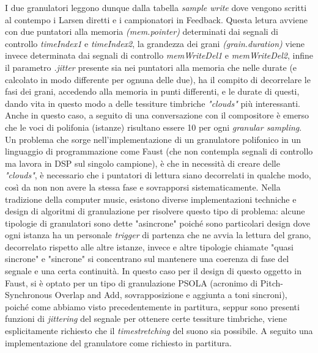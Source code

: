 I due granulatori leggono dunque dalla tabella \textit{sample write} dove vengono scritti
al contempo i Larsen diretti e i campionatori in Feedback. 
Questa letura avviene con due puntatori alla memoria \textit{(mem.pointer)} determinati 
dai segnali di controllo \textit{timeIndex1} e \textit{timeIndex2}, la grandezza dei grani 
\textit{(grain.duration)} viene invece determinata dai segnali di controllo 
\textit{memWriteDel1} e \textit{memWriteDel2}, infine il parametro \textit{.jitter}
presente sia nei puntatori alla memoria che nelle durate (e calcolato in modo differente per ognuna delle due),
ha il compito di decorrelare le fasi dei grani, accedendo alla memoria in punti differenti,
e le durate di questi, dando vita in questo modo a delle tessiture timbriche \textit{"clouds"} più interessanti.
Anche in questo caso, a seguito di una conversazione con il compositore è emerso che le voci di polifonia
(istanze) risultano essere 10 per ogni \textit{granular sampling}.
Un problema che sorge nell'implementazione di un granulatore polifonico in un linguaggio di 
programmazione come Faust (che non contempla segnali di controllo ma lavora in DSP sul singolo campione),
è che in necessità di creare delle \textit{"clouds"}, è necessario che i puntatori di lettura
siano decorrelati in qualche modo, così da non non avere la stessa fase e sovrapporsi sistematicamente.
Nella tradizione della computer music, esistono diverse implementazioni techniche e design 
di algoritmi di granulazione per risolvere questo tipo di problema:
alcune tipologie di granulatori sono dette "asincrone" poiché sono particolari design dove
ogni istanza ha un personale \textit{trigger} 
di partenza che ne avvia la lettura del grano, decorrelato rispetto alle altre istanze,
invece e altre tipologie chiamate "quasi sincrone" e "sincrone" si concentrano sul mantenere
una coerenza di fase del segnale e una certa continuità.
In questo caso per il design di questo oggetto in Faust, si è optato per un tipo di granulazione
PSOLA (acronimo di Pitch-Synchronous Overlap and Add, sovrapposizione e aggiunta a toni sincroni), 
poiché come abbiamo visto precedentemente in partitura, 
seppur sono presenti funzioni di \textit{jittering} del segnale
per ottenere certe tessiture timbriche, viene esplicitamente richiesto
che il \textit{timestretching} del suono sia possibile. 
A seguito una implementazione del granulatore come richiesto in partitura.


